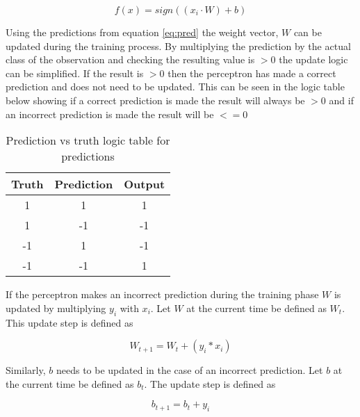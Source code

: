 \documentclass[10pt,twocolumn,letterpaper]{article}
\begin{document}
\begin{equation}\label{eq:pred}
   f(x) = sign((x_i \cdot W) + b)
\end{equation}

Using the predictions from equation \eqref{eq:pred} the weight vector, $W$ can be updated during the training process.
By multiplying the prediction by the actual class of the observation and checking the resulting value is $>0$
the update logic can be simplified. If the result is $>0$ then the perceptron has made a correct prediction
and does not need to be updated. This can be seen in the logic table below showing if a correct
prediction is made the result will always be $>0$ and if an incorrect prediction is made the result will be
$<=0$
\begin{table}[h!]
   \centering
   \begin{tabular}{ ||c c c|| }
      \hline
      Truth & Prediction & Output \\
      \hline
      1     & 1          & 1      \\
      \hline
      1     & -1         & -1     \\
      \hline
      -1    & 1          & -1     \\
      \hline
      -1    & -1         & 1      \\
      \hline
   \end{tabular}      \label{tab:logic}
   \caption{Prediction vs truth logic table for predictions}
\end{table}

If the perceptron makes an incorrect prediction during the training phase $W$ is updated by multiplying
$y_i$ with $x_i$. Let $W$ at the current time be defined as $W_t$. This update step is defined as

\begin{equation}\label{eq:updateweight}
   W_{t+1} = W_t + (y_i * x_i)
\end{equation}

Similarly, $b$ needs to be updated in the case of an incorrect prediction. Let $b$ at the current time
be defined as $b_t$. The update step is defined as

\begin{equation}\label{eq:updateweight}
   b_{t+1} = b_t + y_i
\end{equation}





\small


\end{document}
